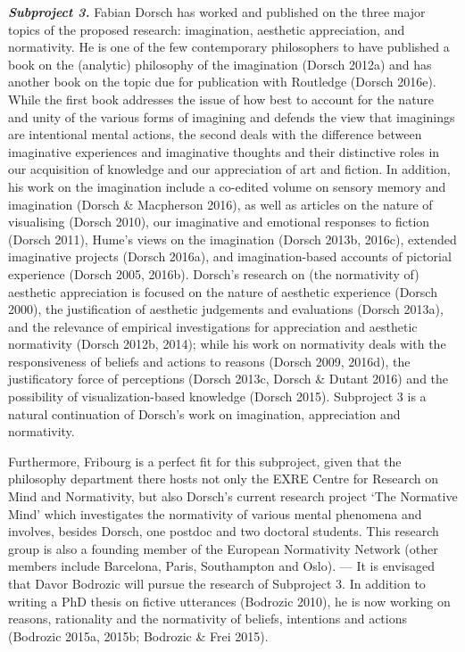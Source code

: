 \vspace{.2cm}
\noindent \textbf{\emph{Subproject 3.}} Fabian Dorsch has worked and published on the three major topics of the proposed research: imagination, aesthetic appreciation, and normativity. He is one of the few contemporary philosophers to have published a book on the (analytic) philosophy of the imagination (Dorsch 2012a) and has another book on the topic due for publication with Routledge (Dorsch 2016e). While the first book addresses the issue of how best to account for the nature and unity of the various forms of imagining and defends the view that imaginings are intentional mental actions, the second deals with the difference between imaginative experiences and imaginative thoughts and their distinctive roles in our acquisition of knowledge and our appreciation of art and fiction. In addition, his work on the imagination include a co-edited volume on sensory memory and imagination (Dorsch \& Macpherson 2016), as well as articles on the nature of visualising (Dorsch 2010), our imaginative and emotional responses to fiction (Dorsch 2011), Hume's views on the imagination (Dorsch 2013b, 2016c), extended imaginative projects (Dorsch 2016a), and imagination-based accounts of pictorial experience (Dorsch 2005, 2016b). Dorsch's research on (the normativity of) aesthetic appreciation is focused on the nature of aesthetic experience (Dorsch 2000), the justification of aesthetic judgements and evaluations (Dorsch 2013a), and the relevance of empirical investigations for appreciation and aesthetic normativity (Dorsch 2012b, 2014); while his work on normativity deals with the responsiveness of beliefs and actions to reasons (Dorsch 2009, 2016d), the justificatory force of perceptions (Dorsch 2013c, Dorsch \& Dutant 2016) and the possibility of visualization-based knowledge (Dorsch 2015). Subproject 3 is a natural continuation of Dorsch's work on imagination, appreciation and normativity.

Furthermore, Fribourg is a perfect fit for this subproject, given that the philosophy department there hosts not only the EXRE Centre for Research on Mind and Normativity, but also Dorsch's current research project `The Normative Mind' which investigates the normativity of various mental phenomena and involves, besides Dorsch, one postdoc and two doctoral students. This research group is also a founding member of the European Normativity Network (other members include Barcelona, Paris, Southampton and Oslo). --- It is envisaged that Davor Bodrozic will pursue the research of Subproject 3. In addition to writing a PhD thesis on fictive utterances (Bodrozic 2010), he is now working on reasons, rationality and the normativity of beliefs, intentions and actions (Bodrozic 2015a, 2015b; Bodrozic \& Frei 2015). 
